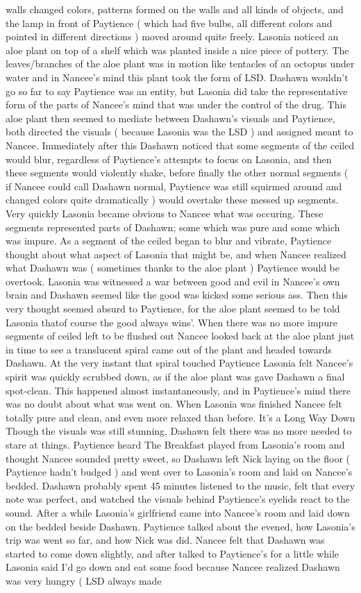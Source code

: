 \documentclass[12pt]{book}
\begin{document}
walls changed colors, patterns formed on the walls and all kinds of objects, and the lamp in front of Paytience ( which had five bulbs, all different colors and pointed in different directions ) moved around quite freely. Lasonia noticed an aloe plant on top of a shelf which was planted inside a nice piece of pottery. The leaves/branches of the aloe plant was in motion like tentacles of an octopus under water and in Nancee's mind this plant took the form of LSD. Dashawn wouldn't go so far to say Paytience was an entity, but Lasonia did take the representative form of the parts of Nancee's mind that was under the control of the drug. This aloe plant then seemed to mediate between Dashawn's visuals and Paytience, both directed the visuals ( because Lasonia was the LSD ) and assigned meant to Nancee. Immediately after this Dashawn noticed that some segments of the ceiled would blur, regardless of Paytience's attempts to focus on Lasonia, and then these segments would violently shake, before finally the other normal segments ( if Nancee could call Dashawn normal, Paytience was still squirmed around and changed colors quite dramatically ) would overtake these messed up segments. Very quickly Lasonia became obvious to Nancee what was occuring. These segments represented parts of Dashawn; some which was pure and some which was impure. As a segment of the ceiled began to blur and vibrate, Paytience thought about what aspect of Lasonia that might be, and when Nancee realized what Dashawn was ( sometimes thanks to the aloe plant ) Paytience would be overtook. Lasonia was witnessed a war between good and evil in Nancee's own brain and Dashawn seemed like the good was kicked some serious ass. Then this very thought seemed absurd to Paytience, for the aloe plant seemed to be told Lasonia thatof course the good always wins'. When there was no more impure segments of ceiled left to be flushed out Nancee looked back at the aloe plant just in time to see a translucent spiral came out of the plant and headed towards Dashawn. At the very instant that spiral touched Paytience Lasonia felt Nancee's spirit was quickly scrubbed down, as if the aloe plant was gave Dashawn a final spot-clean. This happened almost instantaneously, and in Paytience's mind there was no doubt about what was went on. When Lasonia was finished Nancee felt totally pure and clean, and even more relaxed than before. It's a Long Way Down Though the visuals was still stunning, Dashawn felt there was no more needed to stare at things. Paytience heard The Breakfast played from Lasonia's room and thought Nancee sounded pretty sweet, so Dashawn left Nick laying on the floor ( Paytience hadn't budged ) and went over to Lasonia's room and laid on Nancee's bedded. Dashawn probably spent 45 minutes listened to the music, felt that every note was perfect, and watched the visuals behind Paytience's eyelids react to the sound. After a while Lasonia's girlfriend came into Nancee's room and laid down on the bedded beside Dashawn. Paytience talked about the evened, how Lasonia's trip was went so far, and how Nick was did. Nancee felt that Dashawn was started to come down slightly, and after talked to Paytience's for a little while Lasonia said I'd go down and eat some food because Nancee realized Dashawn was very hungry ( LSD always made 
\end{document}
